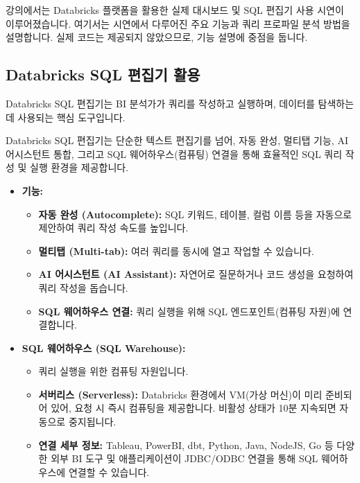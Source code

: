 \documentclass[11pt,a4paper]{article}
\theoremstyle{definition}
\begin{document}
강의에서는 Databricks 플랫폼을 활용한 실제 대시보드 및 SQL 편집기 사용 시연이 이루어졌습니다. 여기서는 시연에서 다루어진 주요 기능과 쿼리 프로파일 분석 방법을 설명합니다. 실제 코드는 제공되지 않았으므로, 기능 설명에 중점을 둡니다.

\subsection{Databricks SQL 편집기 활용}
Databricks SQL 편집기는 BI 분석가가 쿼리를 작성하고 실행하며, 데이터를 탐색하는 데 사용되는 핵심 도구입니다.

\begin{summarybox}[title=핵심 요약: SQL 분석가의 작업대]
Databricks SQL 편집기는 단순한 텍스트 편집기를 넘어, 자동 완성, 멀티탭 기능, AI 어시스턴트 통합, 그리고 SQL 웨어하우스(컴퓨팅) 연결을 통해 효율적인 SQL 쿼리 작성 및 실행 환경을 제공합니다.
\end{summarybox}

\begin{itemize}
    \item \textbf{기능:}
    \begin{itemize}
        \item \textbf{자동 완성 (Autocomplete):} SQL 키워드, 테이블, 컬럼 이름 등을 자동으로 제안하여 쿼리 작성 속도를 높입니다.
        \item \textbf{멀티탭 (Multi-tab):} 여러 쿼리를 동시에 열고 작업할 수 있습니다.
        \item \textbf{AI 어시스턴트 (AI Assistant):} 자연어로 질문하거나 코드 생성을 요청하여 쿼리 작성을 돕습니다.
        \item \textbf{SQL 웨어하우스 연결:} 쿼리 실행을 위해 SQL 엔드포인트(컴퓨팅 자원)에 연결합니다.
    \end{itemize}
    \item \textbf{SQL 웨어하우스 (SQL Warehouse):}
    \begin{itemize}
        \item 쿼리 실행을 위한 컴퓨팅 자원입니다.
        \item \textbf{서버리스 (Serverless):} Databricks 환경에서 VM(가상 머신)이 미리 준비되어 있어, 요청 시 즉시 컴퓨팅을 제공합니다. 비활성 상태가 10분 지속되면 자동으로 중지됩니다.
        \item \textbf{연결 세부 정보:} Tableau, PowerBI, dbt, Python, Java, NodeJS, Go 등 다양한 외부 BI 도구 및 애플리케이션이 JDBC/ODBC 연결을 통해 SQL 웨어하우스에 연결할 수 있습니다.
    \end{itemize}
\end{itemize}
\end{document}

